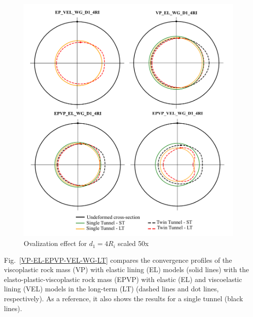 \documentclass[a4paper,fleqn]{cas-sc}
\begin{document}
\begin{figure}[h!]
	\centering
	\includegraphics[scale=0.5]{ovalization.pdf}
	\caption{Ovalization effect for $d_1 = 4R_i$ scaled 50x}
	\label{ovalization}
\end{figure}
\FloatBarrier

Fig.~\ref{VP-EL-EPVP-VEL-WG-LT} compares the convergence profiles of the viscoplastic rock mass (VP) with elastic lining (EL) models (solid lines) with the elasto-plastic-viscoplastic rock mass (EPVP) with elastic (EL) and viscoelastic lining (VEL) models in the long-term (LT) (dashed lines and dot lines, respectively). As a reference, it also shows the results for a single tunnel (black lines).
\end{document}
